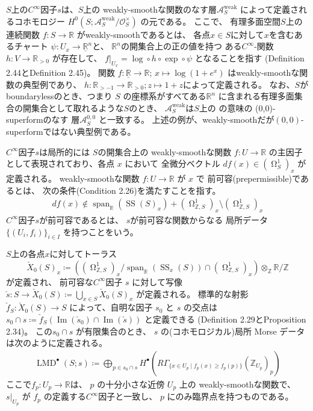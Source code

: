 \documentclass[uplatex,dvipdfmx,12pt]{jsarticle}
\numberwithin{equation}{section}
\theoremstyle{definition}
\newcommand{\deq}{\coloneqq}
\newcommand{\opn}[1]{\operatorname{#1}}
\DeclareMathOperator{\tform}{\Omega}
\begin{document}
$S$上の$C^{\infty}$因子$s$は、$S$上の
weakly-smoothな関数のなす層$\mathcal{A}^{\mathrm{weak}}_S$
によって定義されるコホモロジー
$H^{0}(S;\mathcal{A}^{\mathrm{weak}}_S/\mathcal{O}^{\times}_S)$
の元である。
ここで、
有理多面空間$S$上の連続関数
$f\colon S\to \mathbb{R}$
がweakly-smoothであるとは、
各点$x\in S$に対して$x$を含むあるチャート
$\psi \colon U_x\to \underline{\mathbb{R}}^{n}$と、
$\mathbb{R}^{n}$の開集合上の正の値を持つ
ある$C^{\infty}$-関数$h\colon V\to \mathbb{R}_{>0}$
が存在して、
$f|_{U_x}=\opn{log}\circ h\circ \opn{exp}\circ \psi$
となることを指す
(Definition 2.44とDefinition 2.45)。
関数
$
f\colon \underline{\mathbb{R}}\to \mathbb{R}
$;
$
x\mapsto \opn{log}(1+e^{x})
$
はweakly-smoothな関数の典型例であり、
$h\colon \mathbb{R}_{>-1}
\to \mathbb{R}_{>0};z\mapsto 1+z$によって定義される。
なお、$S$がboundarylessのとき、つまり
$S$ の座標系がすべてある$\mathbb{R}^{n}$ 
に含まれる有理多面集合の開集合として取れるような$S$のとき、
$\mathcal{A}^{\mathrm{weak}}_S$は$S$上の
\cite{MR3903579}の意味の
(0,0)-superformのなす
層$\mathcal{A}^{0,0}_S$
と一致する。
上述の例が、weakly-smoothだが$(0,0)$-superformではない典型例である。

$C^{\infty}$因子$s$は局所的には
$S$の開集合上の 
weakly-smoothな関数 $f\colon U\to \mathbb{R}$
の主因子として表現されており、各点 $x$ において
全微分ベクトル $df(x)\in(\tform_{S}^{1})_x$ 
が定義される。
weakly-smoothな関数
$f\colon U \to \mathbb{R}$ が $x$ で
前可容(prepermissible)であるとは、
次の条件(Condition 2.26)を満たすことを指す。
\begin{align}
df(x)\notin\opn{span}_{\mathbb{R}}(\opn{SS}(S)_x)+
(\tform_{\mathbb{Z},S}^{1})_x 
\setminus (\tform_{\mathbb{Z},S}^{1})_x
\end{align}
$C^{\infty}$因子$s$が前可容であるとは、
$s$が前可容な関数からなる
局所データ$\{(U_i,f_i)\}_{i\in I}$
を持つことをいう。

$S$上の各点$x$に対してトーラス
\begin{equation}
\check{X}_0(S)_x\deq ((\tform^{1}_{\mathbb{Z},S})_x/
\opn{span}_{\mathbb{R}}(\opn{SS}_x(S))\cap 
(\tform^{1}_{\mathbb{Z},S})_x)\otimes_{\mathbb{Z}}
\mathbb{R}/\mathbb{Z}
\end{equation}
が定義され、
前可容な$C^{\infty}$因子 $s$ に対して写像
$\check{s}\colon S\to \check{X}_0(S)\deq 
\bigcup_{x\in S} \check{X}_0(S)_x$ が定義される。 
標準的な射影 $\check{f}_{S}\colon \check{X}_0(S)\to S$
によって、自明な因子 $s_0$ と $s$ の交点は
$s_0\cap s\deq \check{f}_{S}(\opn{Im}(\check{s}_0)\cap 
\opn{Im}(\check{s}))$ と定義できる
(Definition 2.29とProposition 2.34)。
この$s_0\cap s$ が有限集合のとき、
$s$ の(コホモロジカル)局所 Morse データは次のように定義される。
\begin{align} \label{equation-local-morse-data}
\opn{LMD}^{\bullet}(S;s)\deq 
\bigoplus_{p\in s_0\cap s} 
H^{\bullet}(R\Gamma_{\{x\in U_p\mid f_p(x)\geq f_p(p)\}}(\mathbb{Z}_{U_p})_p)
\end{align}
ここで$f_p\colon U_p\to \mathbb{R}$は、
$p$ の十分小さな近傍 $U_p$ 上の weakly-smoothな関数で、
$s|_{U_p}$ が $f_p$ の定義する$C^{\infty}$因子と一致し、
$p$ にのみ臨界点を持つものである。
\end{document}
